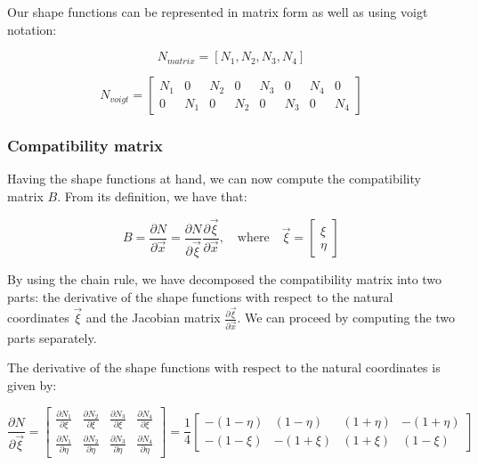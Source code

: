 Our shape functions can be represented in matrix form as well as using voigt notation:

\begin{equation}
    N_{matrix} = [N_1, N_2, N_3, N_4]
\end{equation}

\begin{equation}
    N_{voigt} = \begin{bmatrix}
        N_1 & 0   & N_2 & 0   & N_3 & 0   & N_4 & 0   \\
        0   & N_1 & 0   & N_2 & 0   & N_3 & 0   & N_4
    \end{bmatrix}
\end{equation}



\subsubsection{Compatibility matrix}
\label{subsubsec:compatibility_matrix}

Having the shape functions at hand, we can now compute the compatibility matrix $B$.
From its definition, we have that:

\begin{equation}
    B = \frac{\partial N}{\partial \vec{x}} = \frac{\partial N}{\partial \vec{\xi}} \frac{\partial \vec{\xi}}{\partial \vec{x}}, \quad \text{where} \quad \vec{\xi} = \begin{bmatrix} \xi \\ \eta \end{bmatrix}
    \label{eq:compatibility_matrix}
\end{equation}

By using the chain rule, we have decomposed the compatibility matrix into two parts: the derivative of the shape functions with respect to the natural coordinates $\vec{\xi}$ and the Jacobian matrix $\frac{\partial \vec{\xi}}{\partial \vec{x}}$.
We can proceed by computing the two parts separately.

The derivative of the shape functions with respect to the natural coordinates is given by:

\begin{equation}
    \frac{\partial N}{\partial \vec{\xi}} = \begin{bmatrix}
        \frac{\partial N_1}{\partial \xi}  & \frac{\partial N_2}{\partial \xi}  & \frac{\partial N_3}{\partial \xi}  & \frac{\partial N_4}{\partial \xi}  \\
        \frac{\partial N_1}{\partial \eta} & \frac{\partial N_2}{\partial \eta} & \frac{\partial N_3}{\partial \eta} & \frac{\partial N_4}{\partial \eta}
    \end{bmatrix} = \frac{1}{4} \begin{bmatrix}
        - (1 - \eta) & (1 - \eta)  & (1 + \eta) & - (1 + \eta) \\
        - (1 - \xi)  & - (1 + \xi) & (1 + \xi)  & (1 - \xi)
    \end{bmatrix}
    \label{eq:shape_functions_derivative}
\end{equation}

